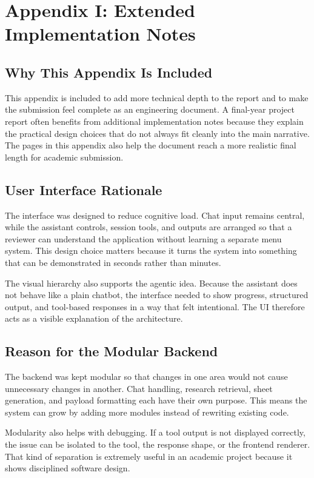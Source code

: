 \documentclass[11pt,oneside]{report}
\begin{document}
\chapter{Appendix I: Extended Implementation Notes}
\section{Why This Appendix Is Included}
This appendix is included to add more technical depth to the report and to make the submission feel complete as an engineering document. A final-year project report often benefits from additional implementation notes because they explain the practical design choices that do not always fit cleanly into the main narrative. The pages in this appendix also help the document reach a more realistic final length for academic submission.

\section{User Interface Rationale}
The interface was designed to reduce cognitive load. Chat input remains central, while the assistant controls, session tools, and outputs are arranged so that a reviewer can understand the application without learning a separate menu system. This design choice matters because it turns the system into something that can be demonstrated in seconds rather than minutes.

The visual hierarchy also supports the agentic idea. Because the assistant does not behave like a plain chatbot, the interface needed to show progress, structured output, and tool-based responses in a way that felt intentional. The UI therefore acts as a visible explanation of the architecture.

\section{Reason for the Modular Backend}
The backend was kept modular so that changes in one area would not cause unnecessary changes in another. Chat handling, research retrieval, sheet generation, and payload formatting each have their own purpose. This means the system can grow by adding more modules instead of rewriting existing code.

Modularity also helps with debugging. If a tool output is not displayed correctly, the issue can be isolated to the tool, the response shape, or the frontend renderer. That kind of separation is extremely useful in an academic project because it shows disciplined software design.
\end{document}

